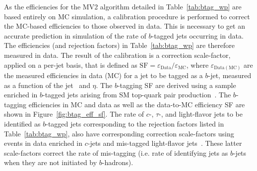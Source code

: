 As the efficiencies for the MV2 algorithm detailed in Table~\ref{tab:btag_wp} are based entirely
on MC simulation, a calibration procedure is performed to correct the MC-based efficiencies to
those observed in data.
This is necessary to get an accurate prediction in simulation of the rate of $b$-tagged jets occurring in data.
The efficiencies (and rejection factors) in Table~\ref{tab:btag_wp} are therefore measured in
data.
The result of the calibration is a correction scale-factor, applied on a per-jet basis, that is defined as
$\text{SF} = \varepsilon_{\text{Data}} / \varepsilon_{\text{MC}}$, where $\varepsilon_{\text{Data}(\text{MC})}$
are the measured efficiencies in data (MC) for a jet to be tagged as a $b$-jet, measured as a function of the jet \pT~and $\eta$.
The $b$-tagging SF are derived using a sample enriched in $b$-tagged jets arising from SM top-quark pair production~\cite{FTAG2019}.
The $b$-tagging efficiencies in MC and data as well as the data-to-MC efficiency SF are shown in Figure~\ref{fig:btag_eff_sf}.
The rate of $c$-, $\tau$-, and light-flavor jets to be identified as $b$-tagged jets corresponding to the rejection factors
listed in Table~\ref{tab:btag_wp}, also have corresponding correction scale-factors using events
in data enriched in $c$-jets and mis-tagged light-flavor jets~\cite{FTAG2019,FTAGCJetCalib,FTAGLightFlavorCalib}.
These latter scale-factors correct the rate of mis-tagging (i.e. rate of identifying jets as $b$-jets when they are
not initiated by $b$-hadrons).

